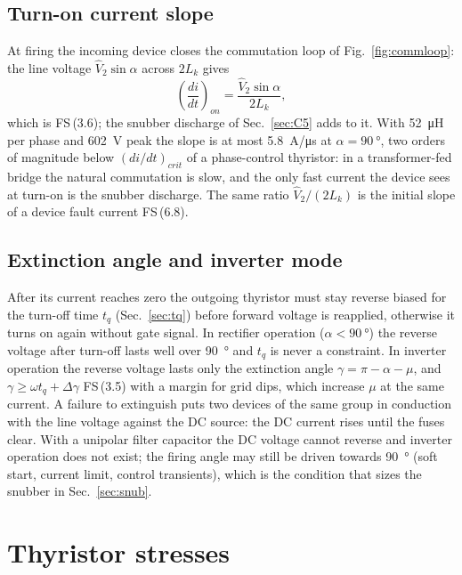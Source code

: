 \documentclass[10pt,a4paper]{scrartcl}
\newcommand{\Lk}{L_{k}}
\newcommand{\fs}[1]{\textsf{FS}\,(#1)}
\begin{document}
\subsection{Turn-on current slope}
At firing the incoming device closes the commutation loop of Fig.~\ref{fig:commloop}: the line voltage $\hat V_2\sin\alpha$ across $2\Lk$ gives
\begin{equation}
\left(\frac{di}{dt}\right)_{on} = \frac{\hat V_2\sin\alpha}{2\Lk} ,
\label{eq:didton}
\end{equation}
which is \fs{3.6}; the snubber discharge of Sec.~\ref{sec:C5} adds to it. With \SI{52}{\micro H} per phase and \SI{602}{V} peak the slope is at most \SI{5.8}{A/\micro s} at $\alpha = \SI{90}{\degree}$, two orders of magnitude below $(di/dt)_{crit}$ of a phase-control thyristor: in a transformer-fed bridge the natural commutation is slow, and the only fast current the device sees at turn-on is the snubber discharge. The same ratio $\hat V_2/(2\Lk)$ is the initial slope of a device fault current \fs{6.8}.

\subsection{Extinction angle and inverter mode}\label{sec:gamma}
After its current reaches zero the outgoing thyristor must stay reverse biased for the turn-off time $t_q$ (Sec.~\ref{sec:tq}) before forward voltage is reapplied, otherwise it turns on again without gate signal. In rectifier operation ($\alpha<\SI{90}{\degree}$) the reverse voltage after turn-off lasts well over \SI{90}{\degree} and $t_q$ is never a constraint. In inverter operation the reverse voltage lasts only the extinction angle $\gamma = \pi-\alpha-\mu$, and $\gamma\ge\omega t_q+\Delta\gamma$ \fs{3.5} with a margin for grid dips, which increase $\mu$ at the same current. A failure to extinguish puts two devices of the same group in conduction with the line voltage against the DC source: the DC current rises until the fuses clear. With a unipolar filter capacitor the DC voltage cannot reverse and inverter operation does not exist; the firing angle may still be driven towards \SI{90}{\degree} (soft start, current limit, control transients), which is the condition that sizes the snubber in Sec.~\ref{sec:snub}.
\section{Thyristor stresses}\label{sec:thy}
\end{document}
